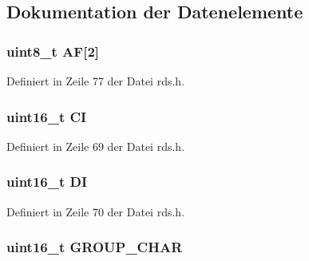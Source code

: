 \subsection{Dokumentation der Datenelemente}
\hypertarget{structgroup__0a_ae5a8515ae995b21e542b2ad52b20c34e}{}
\subsubsection[{A\+F}]{\setlength{\rightskip}{0pt plus 5cm}uint8\+\_\+t A\+F\mbox{[}2\mbox{]}}\label{structgroup__0a_ae5a8515ae995b21e542b2ad52b20c34e}


Definiert in Zeile 77 der Datei rds.\+h.

\hypertarget{structgroup__0a_aa6fd8556e02ce89fed23057f1cb37e44}{}
\subsubsection[{C\+I}]{\setlength{\rightskip}{0pt plus 5cm}uint16\+\_\+t C\+I}\label{structgroup__0a_aa6fd8556e02ce89fed23057f1cb37e44}


Definiert in Zeile 69 der Datei rds.\+h.

\hypertarget{structgroup__0a_ad020d0abff338c9c34924a44478ac591}{}
\subsubsection[{D\+I}]{\setlength{\rightskip}{0pt plus 5cm}uint16\+\_\+t D\+I}\label{structgroup__0a_ad020d0abff338c9c34924a44478ac591}


Definiert in Zeile 70 der Datei rds.\+h.

\hypertarget{structgroup__0a_a66d4119990dc4c3e040a43885e9bb953}{}
\subsubsection[{G\+R\+O\+U\+P\+\_\+\+C\+H\+A\+R}]{\setlength{\rightskip}{0pt plus 5cm}uint16\+\_\+t G\+R\+O\+U\+P\+\_\+\+C\+H\+A\+R}\label{structgroup__0a_a66d4119990dc4c3e040a43885e9bb953}


